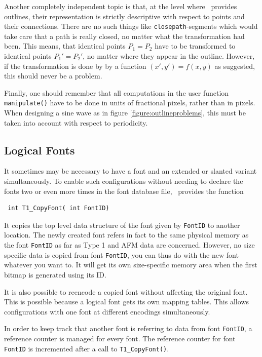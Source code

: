Another completely independent topic is that, at the level where \tonelib\ 
provides outlines, their representation is strictly descriptive with respect
to points and their connections. There are no such things like 
\verb+closepath+-segments which would take care that a path is really closed,
no matter what the transformation had been. This means, that identical points
$P_1 = P_2$ have to be transformed to identical points $P_1'=P_2'$, no matter
where they appear in the outline. However,
if the transformation is done by by a function $(x',y')=f(x,y)$ as suggested,
this should never be a problem.

Finally, one should remember that all computations in the user function
\verb+manipulate()+ have to be done in units of fractional pixels, rather than in
pixels. When designing a sine wave as in figure \ref{figure:outlineproblems},
this must be taken into account with respect to periodicity.

\subsection{Logical Fonts}
\label{logicalfonts}%
It sometimes may be necessary to have a font and an extended or slanted
variant simultaneously. To enable such configurations without needing to
declare the fonts two or even more times in the font database file, 
\tonelib\  provides the function 
\precorr
\begin{verbatim}
 int T1_CopyFont( int FontID)
\end{verbatim}\postcorr
It copies the top level data structure of the font given by \verb+FontID+ to
another location. The newly created font refers in fact to the same 
physical memory as the font \verb+FontID+ as far as Type 1 and AFM data are
concerned. However, no size specific data is copied from font \verb+FontID+,
you can thus do with the new font whatever you want to. It will get its own
size-specific memory area when the first bitmap is generated using its ID.

It is also possible to reencode a copied font without affecting the
original font. This is possible because a logical font gets its own
mapping tables. This allows configurations with one font at different
encodings simultaneously.

In order to keep track that another font is referring to data from
font \verb+FontID+, a reference counter is managed for every font. The
reference counter for font \verb+FontID+ is incremented after a call to
\verb+T1_CopyFont()+. 

